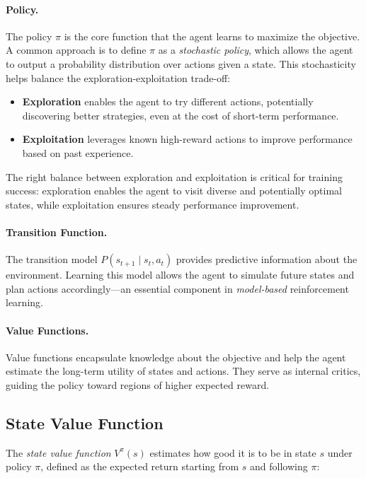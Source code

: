 \documentclass[a4paper,oneside]{book}
\theoremstyle{definition}
\begin{document}
\paragraph{Policy.} The policy \( \pi \) is the core function that the agent learns to maximize the objective. A common approach is to define \( \pi \) as a \textit{stochastic policy}, which allows the agent to output a probability distribution over actions given a state. This stochasticity helps balance the exploration-exploitation trade-off:

\begin{itemize}
    \item \textbf{Exploration} enables the agent to try different actions, potentially discovering better strategies, even at the cost of short-term performance.
    \item \textbf{Exploitation} leverages known high-reward actions to improve performance based on past experience.
\end{itemize}

The right balance between exploration and exploitation is critical for training success: exploration enables the agent to visit diverse and potentially optimal states, while exploitation ensures steady performance improvement.

\paragraph{Transition Function.} The transition model \( P(s_{t+1} \mid s_t, a_t) \) provides predictive information about the environment. Learning this model allows the agent to simulate future states and plan actions accordingly—an essential component in \textit{model-based} reinforcement learning.

\paragraph{Value Functions.} Value functions encapsulate knowledge about the objective and help the agent estimate the long-term utility of states and actions. They serve as internal critics, guiding the policy toward regions of higher expected reward.

\subsection*{State Value Function}

The \textit{state value function} \( V^\pi(s) \) estimates how good it is to be in state \( s \) under policy \( \pi \), defined as the expected return starting from \( s \) and following \( \pi \):
\end{document}
